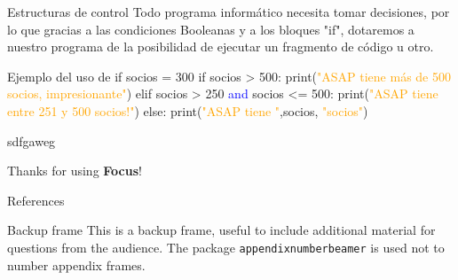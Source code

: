 \documentclass{beamer}
\begin{document}
    \begin{frame}{Estructuras de control}
       Todo programa informático necesita tomar decisiones, por lo que gracias a las condiciones Booleanas y a los bloques "if", dotaremos a nuestro programa de la posibilidad de ejecutar un fragmento de código u otro.
       \begin{Programexample} {Ejemplo del uso de if}
       	socios = 300 \newline
       	if socios > 500:\newline
       	\hspace{3cm}print(\textcolor{orange}{"ASAP tiene más de 500 socios, impresionante"})\newline
       	elif socios > 250 \textcolor{blue}{and} socios <= 500:\newline
       	\hspace{2cm}print(\textcolor{orange}{"ASAP tiene entre 251 y 500 socios!"})\newline
       	else:\newline
       	\hspace{2cm}print(\textcolor{orange}{"ASAP tiene "},socios, \textcolor{orange}{"socios"})
       \end{Programexample}
    \end{frame}
    
    \begin{frame}{sdfgaweg}
       
    \end{frame}

    \begin{frame}[focus]
        Thanks for using \textbf{Focus}!
    \end{frame}
    
    \appendix
    \begin{frame}{References}
        \nocite{*}
        
        
    \end{frame}
    
    \begin{frame}{Backup frame}
        This is a backup frame, useful to include additional material for questions from the audience.
        \vfill
        The package \texttt{appendixnumberbeamer} is used not to number appendix frames.
    \end{frame}
\end{document}
